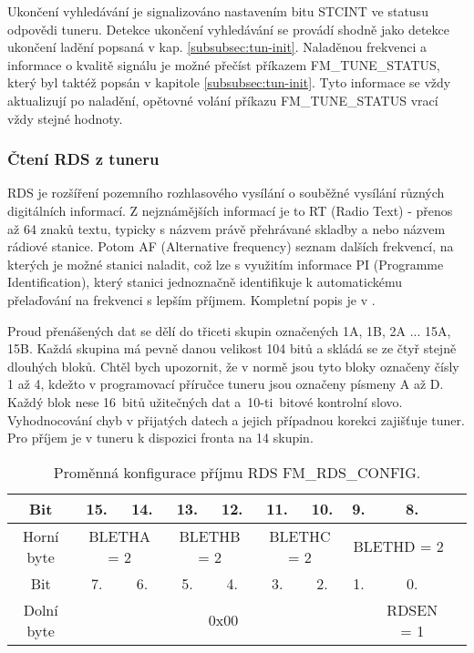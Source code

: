 Ukončení vyhledávání je signalizováno nastavením bitu STCINT ve statusu odpovědi tuneru. Detekce ukončení vyhledávání se provádí shodně jako detekce ukončení ladění popsaná v kap. \ref{subsubsec:tun-init}. Naladěnou frekvenci a informace o kvalitě signálu je možné přečíst příkazem FM\_TUNE\_STATUS, který byl taktéž popsán v kapitole \ref{subsubsec:tun-init}. Tyto informace se vždy aktualizují po naladění, opětovné volání příkazu FM\_TUNE\_STATUS vrací vždy stejné hodnoty. 


\subsubsection{Čtení RDS z tuneru}
RDS je rozšíření pozemního rozhlasového vysílání o souběžné vysílání různých digitálních informací. Z nejznámějších informací je to RT (Radio Text) - přenos až 64 znaků textu, typicky s názvem právě přehrávané skladby a nebo názvem rádiové stanice. Potom AF  (Alternative frequency) seznam dalších frekvencí, na kterých je možné stanici naladit, což lze s využitím informace PI (Programme Identification), který stanici jednoznačně identifikuje k automatickému přelaďování na frekvenci s lepším příjmem. Kompletní popis je v \cite{rds}.

Proud přenášených dat se dělí do třiceti skupin označených 1A, 1B, 2A ... 15A, 15B. Každá skupina má pevně danou velikost 104 bitů a skládá se ze čtyř stejně dlouhých bloků. Chtěl bych upozornit, že v normě \cite{rds} jsou tyto bloky označeny čísly 1 až 4, kdežto v programovací příručce tuneru \cite{tuner-programing} jsou označeny písmeny A až D. Každý blok nese 16~bitů užitečných dat a~10-ti~bitové kontrolní slovo. Vyhodnocování chyb v přijatých datech a jejich případnou korekci zajišťuje tuner. Pro příjem je v tuneru k dispozici fronta na 14 skupin.

\begin{table}[ht!]
\begin{center}
\begin{tabular}{|c|c|c|c|c|c|c|c|c|c|}
\hline 
Bit & 15. & 14. & 13. & 12. & 11. & 10. & 9. & 8. \\  
\hline 
Horní byte & \multicolumn{2}{c|}{BLETHA = 2} & \multicolumn{2}{c|}{BLETHB = 2} & \multicolumn{2}{c|}{BLETHC = 2} & \multicolumn{2}{c|}{BLETHD = 2} \\ 
\hline 
Bit & 7. & 6. & 5. & 4. & 3. & 2. & 1. & 0. \\
\hline 
Dolní byte & \multicolumn{7}{c|}{0x00} & RDSEN = 1 \\ 
\hline 
\end{tabular} 
\end{center}
\caption{Proměnná konfigurace příjmu RDS FM\_RDS\_CONFIG.}
\label{tab:tuner-rds-config} 
\end{table}

